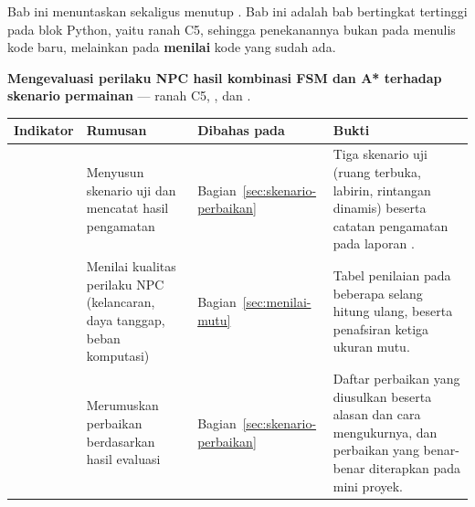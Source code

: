 \begin{subcpmkbox}
Bab ini menuntaskan  sekaligus menutup . Bab ini adalah
bab bertingkat tertinggi pada blok Python, yaitu ranah C5, sehingga penekanannya
bukan pada menulis kode baru, melainkan pada \textbf{menilai} kode yang sudah ada.

\vspace{0.5em}
\textbf{ Mengevaluasi perilaku NPC hasil kombinasi FSM dan A*
terhadap skenario permainan} --- ranah C5, ,  dan .

\vspace{0.5em}
{\setlength{\tabcolsep}{4pt}\footnotesize%
\begin{tabularx}{\textwidth}{@{}C{1.9cm} L{4.0cm} L{2.5cm} Y@{}}
\toprule
\headrow \textbf{Indikator} & \textbf{Rumusan} & \textbf{Dibahas pada} & \textbf{Bukti} \\
\midrule
{} & Menyusun skenario uji dan mencatat hasil pengamatan &
Bagian~\ref{sec:skenario-perbaikan} &
Tiga skenario uji (ruang terbuka, labirin, rintangan dinamis) beserta catatan
pengamatan pada laporan . \\
\addlinespace
{} & Menilai kualitas perilaku NPC (kelancaran, daya tanggap, beban
komputasi) &
Bagian~\ref{sec:menilai-mutu} &
Tabel penilaian pada beberapa selang hitung ulang, beserta penafsiran ketiga
ukuran mutu. \\
\addlinespace
{} & Merumuskan perbaikan berdasarkan hasil evaluasi &
Bagian~\ref{sec:skenario-perbaikan} &
Daftar perbaikan yang diusulkan beserta alasan dan cara mengukurnya, dan
perbaikan yang benar-benar diterapkan pada mini proyek. \\
\bottomrule
\end{tabularx}}
\end{subcpmkbox}
